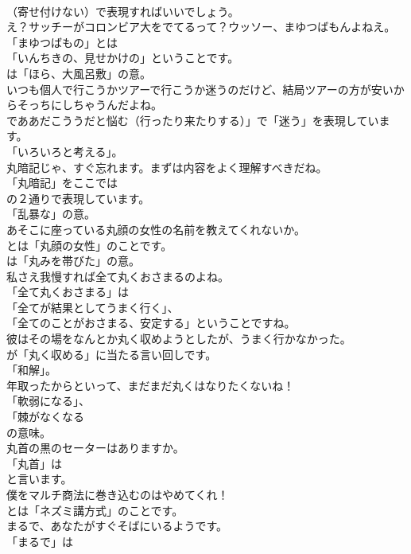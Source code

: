 \documentclass[8pt]{extreport}
\begin{document}
\begin{CJK}{UTF8}{min}
\\	（寄せ付けない）で表現すればいいでしょう。	
\\	え？サッチーがコロンビア大をでてるって？ウッソー、まゆつばもんよねえ。 
\\	「まゆつばもの」とは
\\	「いんちきの、見せかけの」ということです。
\\	は「ほら、大風呂敷」の意。	
\\	いつも個人で行こうかツアーで行こうか迷うのだけど、結局ツアーの方が安いからそっちにしちゃうんだよね。 
\\	でああだこううだと悩む（行ったり来たりする）」で「迷う」を表現しています。
\\	「いろいろと考える」。	
\\	丸暗記じゃ、すぐ忘れます。まずは内容をよく理解すべきだね。 
\\	「丸暗記」をここでは
\\	の２通りで表現しています。
\\	「乱暴な」の意。	
\\	あそこに座っている丸顔の女性の名前を教えてくれないか。 
\\	とは「丸顔の女性」のことです。
\\	は「丸みを帯びた」の意。	
\\	私さえ我慢すれば全て丸くおさまるのよね。 
\\	「全て丸くおさまる」は
\\	「全てが結果としてうまく行く」、
\\	「全てのことがおさまる、安定する」ということですね。	
\\	彼はその場をなんとか丸く収めようとしたが、うまく行かなかった。 
\\	が「丸く収める」に当たる言い回しです。
\\	「和解」。	
\\	年取ったからといって、まだまだ丸くはなりたくないね！ 
\\	「軟弱になる」、
\\	「棘がなくなる
\\	の意味。	
\\	丸首の黒のセーターはありますか。 
\\	「丸首」は
\\	と言います。	
\\	僕をマルチ商法に巻き込むのはやめてくれ！ 
\\	とは「ネズミ講方式」のことです。	
\\	まるで、あなたがすぐそばにいるようです。 
\\	「まるで」は

\end{CJK}
\end{document}
